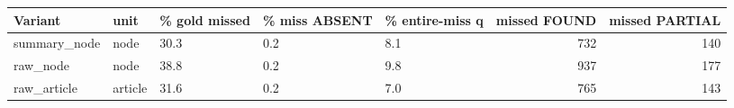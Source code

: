 \begin{tabular}{lllllrr}
\toprule
Variant & unit & \% gold missed & \% miss ABSENT & \% entire-miss q & missed FOUND & missed PARTIAL \\
\midrule
summary_node & node & 30.3 & 0.2 & 8.1 & 732 & 140 \\
raw_node & node & 38.8 & 0.2 & 9.8 & 937 & 177 \\
raw_article & article & 31.6 & 0.2 & 7.0 & 765 & 143 \\
\bottomrule
\end{tabular}
